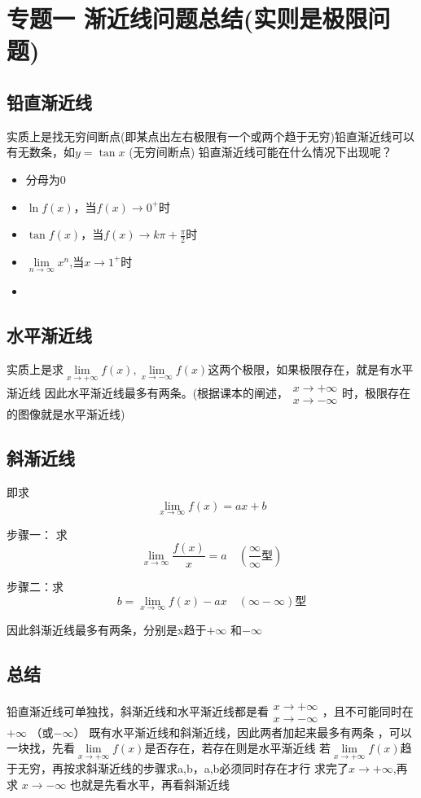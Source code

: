 \documentclass[a4paper,11pt]{book}
\begin{document}
\section*{专题一  \quad 渐近线问题总结(实则是极限问题)}

\subsection*{铅直渐近线} 

实质上是找无穷间断点(即某点出左右极限有一个或两个趋于无穷)铅直渐近线可以有无数条，如$y=\tan x$
(无穷间断点)
铅直渐近线可能在什么情况下出现呢？
\begin{itemize}
\item 分母为0
\item $\ln f(x)$，当$f(x)\rightarrow 0^{+}时$
\item $\tan f(x)$，当$f(x)\rightarrow k \pi +\frac{\pi}{2}$时
\item $\lim\limits _{n \rightarrow \infty}x^{n}$,当$x \rightarrow 1^{+}时$
\item 
\end{itemize}
\subsection*{水平渐近线}
实质上是求$\lim\limits_{x \rightarrow +\infty}f(x)
,\lim\limits_{x \rightarrow -\infty}f(x)$这两个极限，如果极限存在，就是有水平渐近线
因此水平渐近线最多有两条。(根据课本的阐述，$\begin{array}{l}
    x \rightarrow+\infty \\
    x \rightarrow-\infty
\end{array}$时，极限存在的图像就是水平渐近线)
\subsection*{斜渐近线}
即求
\[\lim _{x \rightarrow \infty}f(x)=ax+b\]

步骤一： 求\[\lim_{x\rightarrow\infty}\frac{f(x)}{x}=a \quad \left(\frac{\infty}{\infty}\text{型}\right)\]

步骤二：求\[b=\lim _{x \rightarrow \infty}f(x)-ax\quad \left(\infty - \infty\right)\text{型}\]

因此斜渐近线最多有两条，分别是x趋于$+ \infty$ 和$- \infty$ 

\subsection*{总结}
铅直渐近线可单独找，斜渐近线和水平渐近线都是看$\begin{array}{l}
    x \rightarrow+\infty \\
    x \rightarrow-\infty
\end{array}$，且不可能同时在$+ \infty$ （或$- \infty$） 既有水平渐近线和斜渐近线，因此两者加起来最多有两条
，可以一块找，先看$\lim\limits_{x \rightarrow + \infty}f(x)$是否存在，若存在则是水平渐近线
若$\lim\limits_{x \rightarrow + \infty}f(x)$趋于无穷，再按求斜渐近线的步骤求a,b，a,b必须同时存在才行
求完了$x \rightarrow + \infty$,再求 $x \rightarrow - \infty$
也就是先看水平，再看斜渐近线
\end{document}
